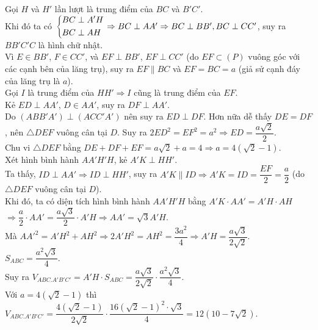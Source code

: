 \begin{ex}
{\begin{center}
		\end{center}
		Gọi $H$ và $H'$ lần lượt là trung điểm của $BC$ và $B'C'$.\\ Khi đó ta có $\left\{\begin{aligned}&BC\perp A'H\\&BC\perp AH\end{aligned}\right.\Rightarrow BC\perp AA'\Rightarrow BC\perp BB', BC\perp CC'$, suy ra $BB'C'C$ là hình chữ nhật.\\
		Vì $E\in BB'$, $F\in CC'$, và $EF\perp BB'$, $EF\perp CC'$ (do $EF\subset(P)$ vuông góc với các cạnh bên của lăng trụ), suy ra $EF\parallel BC$ và $EF=BC =a$ (giả sử cạnh đáy của lăng trụ là $a$).\\
		Gọi $I$ là trung điểm của $HH'\Rightarrow I$ cũng là trung điểm của $EF$.\\
		Kẻ $ED\perp AA'$, $D\in AA'$, suy ra $DF\perp AA'$.\\
		Do $(ABB'A')\perp(ACC'A')$ nên suy ra $ED\perp DF$. Hơn nữa dễ thấy $DE=DF$, nên $\triangle DEF$ vuông cân tại $D$. Suy ra $2ED^2=EF^2=a^2\Rightarrow ED=\dfrac{a\sqrt{2}}{2}$.\\
		Chu vi $\triangle DEF$ bằng $DE+DF+EF=a\sqrt{2}+a=4\Rightarrow a=4(\sqrt{2}-1)$.\\
		Xét hình bình hành $AA'H'H$, kẻ $A'K\perp HH'$.\\ Ta thấy, $ID\perp AA'\Rightarrow ID\perp HH'$, suy ra $A'K\parallel ID\Rightarrow A'K=ID=\dfrac{EF}{2}=\dfrac{a}{2}$ (do $\triangle DEF$ vuông cân tại $D$).\\
		Khi đó, ta có diện tích hình bình hành $AA'H'H$ bằng $A'K\cdot AA'=A'H\cdot AH$ \\
		$ \Rightarrow\dfrac{a}{2}\cdot AA'=\dfrac{a\sqrt{3}}{2}\cdot A'H\Rightarrow AA'=\sqrt{3}A'H $.\\
		Mà $AA'^2=A'H^2+AH^2\Rightarrow 2A'H^2=AH^2=\dfrac{3a^2}{4}\Rightarrow A'H=\dfrac{a\sqrt{3}}{2\sqrt{2}}$.\\
		$S_{ABC}=\dfrac{a^2\sqrt{3}}{4}$.\\
		Suy ra $V_{ABC.A'B'C'}=A'H\cdot S_{ABC}=\dfrac{a\sqrt{3}}{2\sqrt{2}}\cdot\dfrac{a^2\sqrt{3}}{4}$.\\
		Với $a=4(\sqrt{2}-1)$ thì $V_{ABC.A'B'C'}=\dfrac{4(\sqrt{2}-1)}{2\sqrt{2}}\cdot\dfrac{16(\sqrt{2}-1)^2\cdot\sqrt{3}}{4}=12\left(10-7\sqrt{2}\right)$.}
\end{ex}
